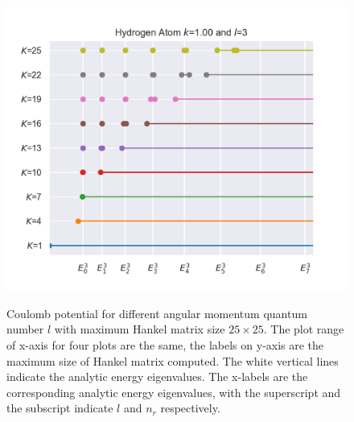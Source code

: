 \documentclass[10pt]{article}
\begin{document}
\begin{figure}[!htb]
{\includegraphics[scale=0.43]{result_N25_k1.00_l3.png}\label{cp25c}
}\qquad
{}
\caption{Coulomb potential for different angular momentum quantum number $l$ with maximum Hankel matrix size $25\times 25$. The plot range of x-axis for four plots are the same, the labels on y-axis are the maximum size of Hankel matrix computed. The white vertical lines indicate the analytic energy eigenvalues. The x-labels are the corresponding analytic energy eigenvalues, with the superscript and the subscript indicate $l$ and $n_r$ respectively.}
\label{cp25}
\end{figure}
\end{document}
